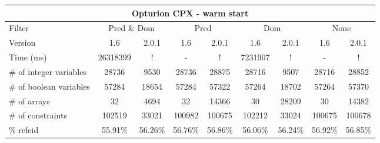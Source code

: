 \documentclass{standalone}
\begin{document}
\begin{table}[H]
\footnotesize
\begin{tabular}{lc|c|c|c|c|c|c|c}
\multicolumn{9}{c}{Opturion CPX - warm start} \\ 
\hline\hline Filter & \multicolumn{2}{c|}{Pred \& Dom} &\multicolumn{2}{c|}{Pred}  & \multicolumn{2}{c|}{Dom} & \multicolumn{2}{c}{None} \\ 
\hline Version & 1.6 & 2.0.1 & 1.6 & 2.0.1 & 1.6 & 2.0.1 & 1.6 & 2.0.1 \\ 
Time (ms)               & 26318399 & !       & -       & !       & 7231907 & !       & -       & !       \\ 
\# of integer variables & 28736    & 9530    & 28736   & 28875   & 28716   & 9507    & 28716   & 28852	  \\ 
\# of boolean variables & 57284    & 18654   & 57284   & 57322   & 57264   & 18702   & 57264   & 57370	  \\ 
\# of arrays            & 32       & 4694    & 32      & 14366   & 30      & 28209   & 30      & 14382	  \\ 
\# of constraints       & 102519   & 33021   & 100982  & 100675  & 102212  & 33024   & 100675  & 100678  \\ 
\% refeid               & 55.91\%  & 56.26\% & 56.76\% & 56.86\% & 56.06\% & 56.24\% & 56.92\% & 56.85\% \\ 
\end{tabular} 
\end{table}
\end{document}
